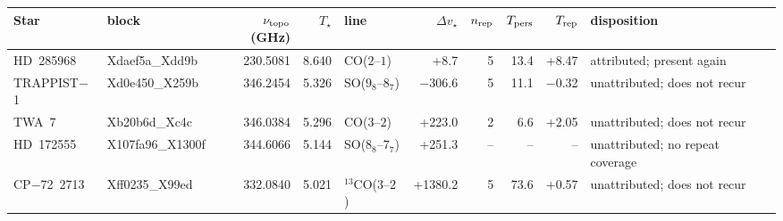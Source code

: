\begin{tabular}{@{}l@{~}l@{~}r@{~}r@{~}l@{~}r@{~~}r@{~}r@{~}r@{~}l@{}}
\hline
Star & block & $\nu_{\rm topo}$ (GHz) & $T_\star$ & line & $\Delta v_\star$ & $n_{\rm rep}$ & $T_{\rm pers}$ & $T_{\rm rep}$ & disposition \\
\hline
HD~285968 & Xdaef5a\_Xdd9b & 230.5081 & 8.640 & CO($2$--$1$) & +8.7 & 5 & 13.4 & +8.47 & attributed; present again \\
TRAPPIST$-$1 & Xd0e450\_X259b & 346.2454 & 5.326 & SO($9_{8}$--$8_{7}$) & \ensuremath{-}306.6 & 5 & 11.1 & \ensuremath{-}0.32 & unattributed; does not recur \\
TWA~7 & Xb20b6d\_Xc4c & 346.0384 & 5.296 & CO($3$--$2$) & +223.0 & 2 & 6.6 & +2.05 & unattributed; does not recur \\
HD~172555 & X107fa96\_X1300f & 344.6066 & 5.144 & SO($8_{8}$--$7_{7}$) & +251.3 & -- & -- & -- & unattributed; no repeat coverage \\
CP$-$72~2713 & Xff0235\_X99ed & 332.0840 & 5.021 & $^{13}$CO($3$--$2$) & +1380.2 & 5 & 73.6 & +0.57 & unattributed; does not recur \\
\hline
\end{tabular}
